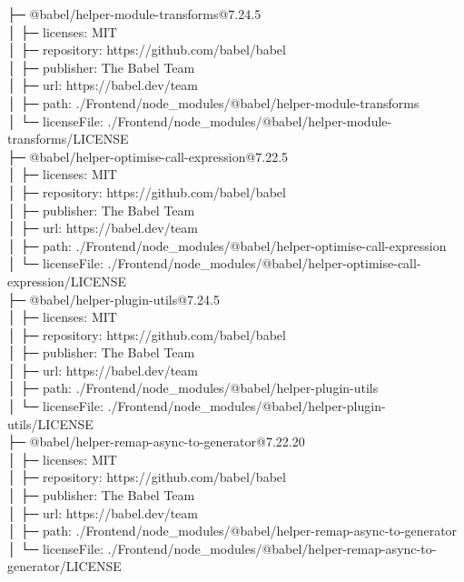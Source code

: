 \documentclass[
    paper=a4,
    twoside=false,
    parskip=half,
    listof=entryprefix,
    listof=totoc,
    index=totoc,
    bibliography=totoc,
    headsepline,
]{scrbook}
\begin{document}
    ├─ @babel/helper-module-transforms@7.24.5\\
    │  ├─ licenses: MIT\\
    │  ├─ repository: https://github.com/babel/babel\\
    │  ├─ publisher: The Babel Team\\
    │  ├─ url: https://babel.dev/team\\
    │  ├─ path: ./Frontend/node\_modules/@babel/helper-module-transforms\\
    │  └─ licenseFile: ./Frontend/node\_modules/@babel/helper-module-transforms/LICENSE\\
    ├─ @babel/helper-optimise-call-expression@7.22.5\\
    │  ├─ licenses: MIT\\
    │  ├─ repository: https://github.com/babel/babel\\
    │  ├─ publisher: The Babel Team\\
    │  ├─ url: https://babel.dev/team\\
    │  ├─ path: ./Frontend/node\_modules/@babel/helper-optimise-call-expression\\
    │  └─ licenseFile: ./Frontend/node\_modules/@babel/helper-optimise-call-expression/LICENSE\\
    ├─ @babel/helper-plugin-utils@7.24.5\\
    │  ├─ licenses: MIT\\
    │  ├─ repository: https://github.com/babel/babel\\
    │  ├─ publisher: The Babel Team\\
    │  ├─ url: https://babel.dev/team\\
    │  ├─ path: ./Frontend/node\_modules/@babel/helper-plugin-utils\\
    │  └─ licenseFile: ./Frontend/node\_modules/@babel/helper-plugin-utils/LICENSE\\
    ├─ @babel/helper-remap-async-to-generator@7.22.20\\
    │  ├─ licenses: MIT\\
    │  ├─ repository: https://github.com/babel/babel\\
    │  ├─ publisher: The Babel Team\\
    │  ├─ url: https://babel.dev/team\\
    │  ├─ path: ./Frontend/node\_modules/@babel/helper-remap-async-to-generator\\
    │  └─ licenseFile: ./Frontend/node\_modules/@babel/helper-remap-async-to-generator/LICENSE\\
\end{document}
